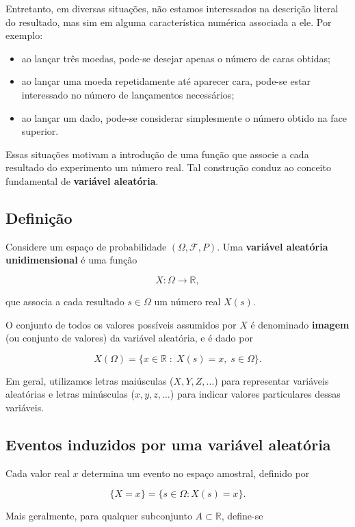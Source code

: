 Entretanto, em diversas situações, não estamos interessados na descrição literal do resultado, mas sim em alguma característica numérica associada a ele. Por exemplo:

\begin{itemize}
    \item ao lançar três moedas, pode-se desejar apenas o número de caras obtidas;
    \item ao lançar uma moeda repetidamente até aparecer cara, pode-se estar interessado no número de lançamentos necessários;
    \item ao lançar um dado, pode-se considerar simplesmente o número obtido na face superior.
\end{itemize}

Essas situações motivam a introdução de uma função que associe a cada resultado do experimento um número real. Tal construção conduz ao conceito fundamental de \textbf{variável aleatória}.

\subsection{Definição}

Considere um espaço de probabilidade $(\Omega,\mathcal{F},P)$.
Uma \textbf{variável aleatória unidimensional} é uma função

\[
X:\Omega \longrightarrow \mathbb{R},
\]

que associa a cada resultado $s\in\Omega$ um número real $X(s)$.

O conjunto de todos os valores possíveis assumidos por $X$ é denominado
\textbf{imagem} (ou conjunto de valores) da variável aleatória, e é dado por

\[
X(\Omega)=\{x\in\mathbb{R}\;:\; X(s)=x,\; s\in\Omega\}.
\]

Em geral, utilizamos letras maiúsculas ($X,Y,Z,\dots$) para representar variáveis aleatórias e letras minúsculas ($x,y,z,\dots$) para indicar valores particulares dessas variáveis.

\subsection{Eventos induzidos por uma variável aleatória}

Cada valor real $x$ determina um evento no espaço amostral, definido por

\[
\{X=x\} = \{ s \in \Omega : X(s)=x \}.
\]

Mais geralmente, para qualquer subconjunto $A \subset \mathbb{R}$, define-se

